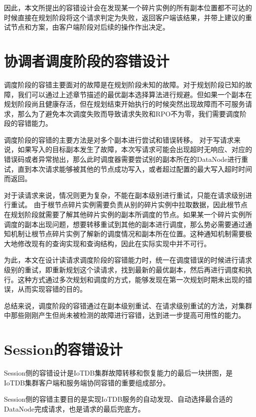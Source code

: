 因此，本文所提出的容错设计会在发现某一个碎片实例的所有副本位置都不可达的时候直接在规划阶段将这个请求判定为失败，返回客户端该结果，并带上建议的重试节点和方案，由客户端阶段对后续的操作作出决定。


\section{协调者调度阶段的容错设计}\label{sec:failover-schedule}


调度阶段的容错主要面对的故障是在规划阶段未知的故障。对于规划阶段已知的故障，我们可以通过上述章节描述的最优副本选择算法进行规避。但如果一个副本在规划阶段尚且健康存活，但在规划结束开始执行的时候突然出现故障而不可服务请求，那么为了避免本次调度失败而导致请求失败和RPO不为零，我们需要调度阶段的容错能力。

调度阶段的容错的主要方法是对多个副本进行尝试和错误转移。
对于写请求来说，如果写入的目标副本发生了故障，本次写请求可能会出现超时无响应、对应的错误码或者异常抛出，那么此时调度器需要尝试别的副本所在的DataNode进行重试，直到本次请求能够被其他的节点成功写入，或者超过配置的最大写入超时时间而返回。

对于读请求来说，情况则更为复杂，不能在副本级别进行重试，只能在请求级别进行重试。
由于根节点碎片实例需要负责从别的碎片实例中拉取数据，因此根节点在规划阶段就需要了解其他碎片实例的副本所调度的节点。如果某一个碎片实例所调度的副本出现问题，想要转移重试到其他的副本进行调度，那么势必需要通过通知机制让根节点碎片实例了解新的调度情况和副本所在位置。这种通知机制需要极大地修改现有的查询实现和查询结构，因此在实际实现中并不可行。

为此，本文在设计读请求调度阶段的容错能力时，统一在调度错误的时候进行请求级别的重试，即重新规划这个读请求，找到最新的最优副本，然后再进行调度和执行。这种方式通过多次规划和调度的方式，能够发现在第一次规划时期未出现的错误，从而实现容错的目的。

总结来说，调度阶段的容错通过在副本级别重试、在请求级别重试的方法，对集群中那些刚刚产生但尚未被检测的故障进行容错，达到进一步提高可用性的能力。

\section{Session的容错设计}

Session侧的容错设计是IoTDB集群故障转移和恢复能力的最后一块拼图，是IoTDB集群客户端和服务端协同容错的重要组成部分。

Session侧的容错主要目的是实现IoTDB服务的自动发现、自动选择最合适的DataNode完成请求，也是请求的最后兜底方。

